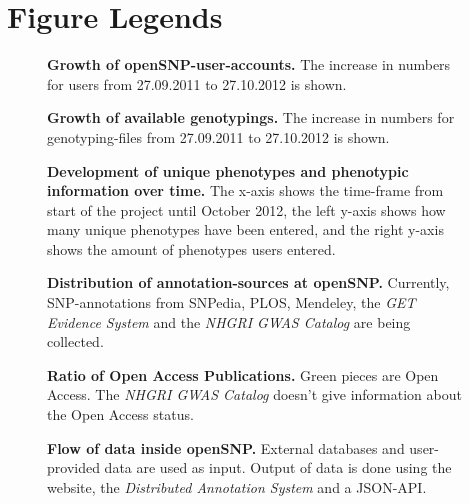 \documentclass[10pt]{article}
\begin{document}
\section*{Figure Legends}
\begin{figure}[!ht]
	\begin{center}
	\end{center}
	\caption{
	{\bf Growth of openSNP-user-accounts.} The increase in numbers for users from 27.09.2011 to 27.10.2012 is shown.} 
	\label{Figure1_label}
\end{figure}
\begin{figure}[!ht]
	\begin{center}
	\end{center}
	\caption{
	{\bf Growth of available genotypings.} The increase in numbers for genotyping-files from 27.09.2011 to 27.10.2012 is shown.} 
	\label{Figure2_label}
\end{figure}
\begin{figure}[!ht]
	\begin{center}
	\end{center}
	\caption{
	{\bf Development of unique phenotypes and phenotypic information over time.} The x-axis shows the time-frame from start of the project until October 2012, the left y-axis shows how many unique phenotypes have been entered, and the right y-axis shows the amount of phenotypes users entered.}
	\label{pheno}
\end{figure}

\begin{figure}[!ht]
	\begin{center}
	\end{center}
	\caption{
	{\bf Distribution of annotation-sources at openSNP.} Currently, SNP-annotations from SNPedia, PLOS, Mendeley, the \emph{GET Evidence System} and the \emph{NHGRI GWAS Catalog} are being collected.}
	\label{Figure3_label}
\end{figure}

\begin{figure}[!ht]
	\begin{center}
	\end{center}
	\caption{
	{\bf Ratio of Open Access Publications.} Green pieces are Open Access. The \emph{NHGRI GWAS Catalog} doesn't give information about the Open Access status.}
	\label{oa_label}
\end{figure}

\begin{figure}[!ht]
	\begin{center}
	\end{center}
	\caption{
	{\bf Flow of data inside openSNP.} External databases and user-provided data are used as input. Output of data is done using the website, the \emph{Distributed Annotation System} and a JSON-API.} 
	\label{Figure4_label}
\end{figure}
\end{document}
